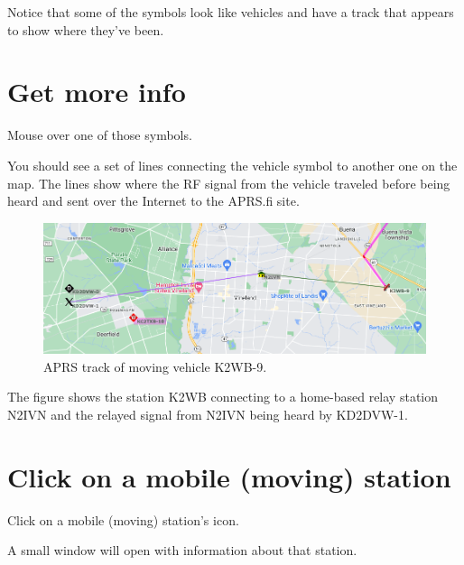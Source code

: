 \documentclass[
  letterpaper,
  DIV=11,
  numbers=noendperiod]{scrreport}
\begin{document}
Notice that some of the symbols look like vehicles and have a track that
appears to show where they've been.

\hypertarget{get-more-info}{%
\section*{Get more info}\label{get-more-info}}


Mouse over one of those symbols.

You should see a set of lines connecting the vehicle symbol to another
one on the map. The lines show where the RF signal from the vehicle
traveled before being heard and sent over the Internet to the APRS.fi
site.

\begin{figure}

{\centering \includegraphics[width=1\textwidth,height=\textheight]{include/img/aprs-track.png}

}

\caption{APRS track of moving vehicle K2WB-9.}

\end{figure}

The figure shows the station K2WB connecting to a home-based relay
station N2IVN and the relayed signal from N2IVN being heard by KD2DVW-1.

\hypertarget{click-on-a-mobile-moving-station}{%
\section*{Click on a mobile (moving)
station}\label{click-on-a-mobile-moving-station}}


Click on a mobile (moving) station's icon.

A small window will open with information about that station.
\end{document}
